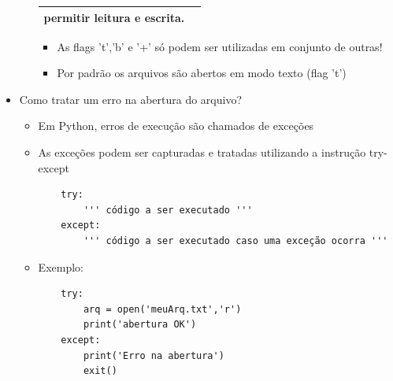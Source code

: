 \documentclass[12pt]{article}
\begin{document}
\begin{itemize}
\begin{itemize}
\begin{table}[H]
\begin{tabular}{|c| p{10cm}|}
                        permitir leitura e escrita. \\ \hline
                    \end{tabular}
                \end{table}
                \begin{itemize}
                    \item As flags 't','b' e '+' só podem ser utilizadas em 
                    conjunto de outras!
                    \item Por padrão os arquivos são abertos em modo texto 
                    (flag 't')
                \end{itemize}
            \end{itemize}
            \item Como tratar um erro na abertura do arquivo?
            \begin{itemize}
                \item Em Python, erros de execução são chamados de exceções
                \item As exceções podem ser capturadas e tratadas utilizando a 
                instrução try-except
                \begin{verbatim}
    try:
        ''' código a ser executado '''
    except:
        ''' código a ser executado caso uma exceção ocorra '''\end{verbatim}
                \item Exemplo:
                \begin{verbatim}
    try:
        arq = open('meuArq.txt','r')
        print('abertura OK')
    except:
        print('Erro na abertura')
        exit()\end{verbatim}
            \end{itemize}
        \end{itemize}
\end{document}
